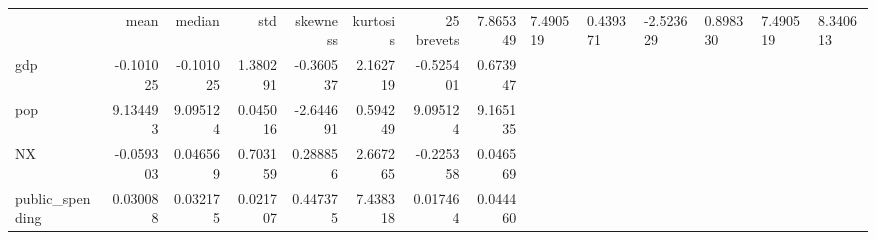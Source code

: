\begin{tabular}{lrrrrrrr}
\toprule
 & mean & median & std & skewness & kurtosis & 25%
\midrule
brevets & 7.865349 & 7.490519 & 0.439371 & -2.523629 & 0.898330 & 7.490519 & 8.340613 \\
gdp & -0.101025 & -0.101025 & 1.380291 & -0.360537 & 2.162719 & -0.525401 & 0.673947 \\
pop & 9.134493 & 9.095124 & 0.045016 & -2.644691 & 0.594249 & 9.095124 & 9.165135 \\
NX & -0.059303 & 0.046569 & 0.703159 & 0.288856 & 2.667265 & -0.225358 & 0.046569 \\
public_spending & 0.030088 & 0.032175 & 0.021707 & 0.447375 & 7.438318 & 0.017464 & 0.044460 \\
\bottomrule
\end{tabular}
